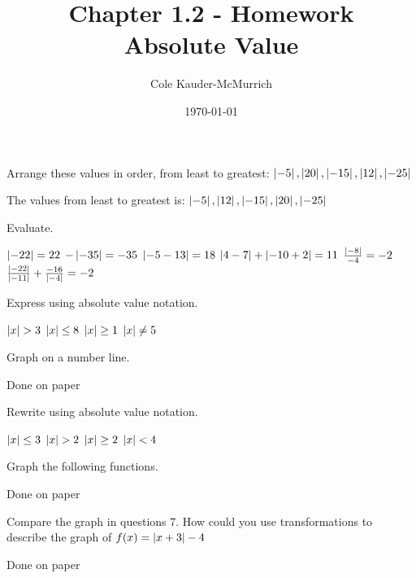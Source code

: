 \documentclass{exam}
\title{\Huge{Chapter 1.2 - Homework}\\\huge{Absolute Value}}
\author{Cole Kauder-McMurrich}
\date{\today}
\begin{document}
    \maketitle
\begin{questions}
    \question Arrange these values in order, from least to greatest:
    $ \left|-5\right|, \left|20\right|, \left|-15\right|, \left|12\right|, \left|-25\right| $

    The values from least to greatest is: $ \left|-5\right|, \left|12\right|, \left|-15\right|, \left|20\right|, \left|-25\right| $

    \question Evaluate.

    \begin{answers}{3}
        \answer \( \left|-22\right| = 22 \)
        \answer \( -\left|-35\right| = -35 \)
        \answer \( \left|-5 - 13\right|=18 \)
        \answer \( \left|4 - 7\right| + \left|-10 + 2\right| = 11\)
        \answer \(\frac{\left|-8\right|}{-4} = -2\)
        \answer \(\frac{\left|-22\right|}{\left|-11\right|} + \frac{-16}{\left|-4\right|} = -2\)
    \end{answers}

    \question Express using absolute value notation.

    \begin{answers}{4}
        \answer \(\left|x\right| > 3\)
        \answer \(\left|x\right| \le 8\)
        \answer \(\left|x\right| \geq 1 \)
        \answer \( \left|x\right| \ne 5 \)
    \end{answers}

    \question Graph on a number line.

    Done on paper

    \question Rewrite using absolute value notation.

    \begin{answers}{4}
        \answer \( \left|x\right| \leq 3 \)
        \answer \( \left|x\right| > 2\)
        \answer \( \left|x\right| \ge 2\)
        \answer \( \left|x\right| < 4 \)
    \end{answers}

    \addtocounter{question}{1}

    \question Graph the following functions.

    Done on paper

    \question Compare the graph in questions 7. How could you use transformations to describe the graph of \(f(x)=\left|x+3\right| -4\)

    Done on paper
    
\end{questions}
\end{document}
